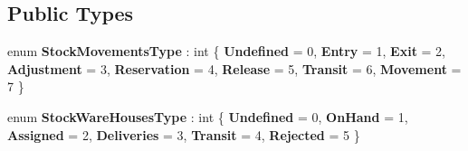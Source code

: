 \subsection*{Public Types}
\begin{DoxyCompactItemize}
\item 
\mbox{\label{class_h_k_supply_1_1_p_r_j___stocks_1_1_classes_1_1_stocks_a23e4731e2f60498707439dbbeca97aee}} 
enum {\bfseries Stock\+Movements\+Type} \+: int \{ \newline
{\bfseries Undefined} = 0, 
{\bfseries Entry} = 1, 
{\bfseries Exit} = 2, 
{\bfseries Adjustment} = 3, 
\newline
{\bfseries Reservation} = 4, 
{\bfseries Release} = 5, 
{\bfseries Transit} = 6, 
{\bfseries Movement} = 7
 \}
\item 
\mbox{\label{class_h_k_supply_1_1_p_r_j___stocks_1_1_classes_1_1_stocks_a593da3bed551ce1d6a581927a569c1a8}} 
enum {\bfseries Stock\+Ware\+Houses\+Type} \+: int \{ \newline
{\bfseries Undefined} = 0, 
{\bfseries On\+Hand} = 1, 
{\bfseries Assigned} = 2, 
{\bfseries Deliveries} = 3, 
\newline
{\bfseries Transit} = 4, 
{\bfseries Rejected} = 5
 \}
\end{DoxyCompactItemize}
